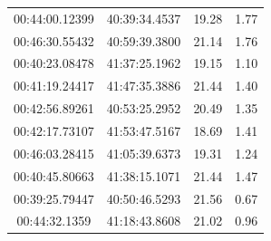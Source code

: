 \documentclass[iop, apj]{emulateapj}
\newcommand{\?}{\stackrel{?}{=}}
\begin{document}
\begin{table}[t]
\begin{center}
\begin{tabular}{cccc}
00:44:00.12399	&40:39:34.4537		&19.28 	&1.77	\\%
00:46:30.55432	&40:59:39.3800		&21.14 	&1.76	\\%
00:40:23.08478	&41:37:25.1962		&19.15 	&1.10	\\%
00:41:19.24417	&41:47:35.3886		&21.44 	&1.40	\\%
00:42:56.89261	&40:53:25.2952		&20.49 	&1.35	\\%
00:42:17.73107	&41:53:47.5167		&18.69 	&1.41	\\%
00:46:03.28415	&41:05:39.6373		&19.31 	&1.24	\\%
00:40:45.80663	&41:38:15.1071		&21.44 	&1.47	\\%
00:39:25.79447	&40:50:46.5293		&21.56 	&0.67	\\%
00:44:32.1359	&41:18:43.8608		&21.02	&0.96	\\%
\hline
  	\end{tabular}
	   \end{center}
   \end{table}




\clearpage
\end{document}
